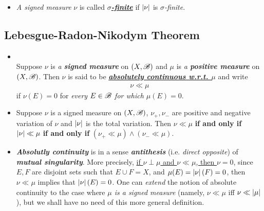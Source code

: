 \documentclass[11pt]{article}
\begin{document}
\begin{itemize}
\item \begin{definition} 
\emph{A signed measure} $\nu$ is called \underline{\emph{\textbf{$\sigma$-finite}}} if $\left\lvert \nu \right\rvert$ is \emph{$\sigma$-finite}.
\end{definition}
\end{itemize}

\subsection{Lebesgue-Radon-Nikodym Theorem}
\begin{itemize}
\item \begin{definition}\citep{folland2013real}\\
Suppose $\nu$ is \emph{a \textbf{signed measure}} on $(X,{\mathscr B})$ and $\mu$ is \emph{a \textbf{positive measure}} on $(X,{\mathscr B})$. Then $\nu$ is said to be \underline{\emph{\textbf{absolutely continuous w.r.t. $\mu$}}} and write
\begin{align*}
\nu \ll \mu 
\end{align*}
if $\nu(E)=0$ for \emph{every $E\in {\mathscr B}$ for which $\mu(E)=0$}. 
\end{definition}

\item
\begin{proposition}
Suppose $\nu$ is a signed measure on $(X,{\mathscr B})$,  $ \nu_{+}, \nu_{-}$ are positive and negative variation of $\nu$ and $\left\lvert \nu \right\rvert$ is the total variation. Then 
$\nu \ll \mu $ \textbf{if and only if} $\left\lvert \nu \right\rvert \ll \mu$ \textbf{if and only if} $(\nu_{+} \ll  \mu) \wedge (\nu_{-} \ll  \mu)$.
\end{proposition}

\item \begin{remark}
\emph{\textbf{Absolutly continuity}} is in a sense \emph{\textbf{antithesis}} (i.e. \emph{direct opposite}) of \emph{\textbf{mutual singularity}}. More precisely, 
\underline{if $\nu \perp \mu$ and $\nu \ll \mu$, then $\nu = 0$}, since $E, F$ are disjoint sets such that $E\cup F= X$, and $\mu(E)= \left\lvert \nu \right\rvert(F)= 0$, then $\nu \ll \mu$ implies that $\left\lvert \nu \right\rvert(E)= 0$. One can \emph{extend} the notion of absolute continuity to the case where \emph{$\mu$ is a signed measure} (namely, $\nu \ll \mu$ iff $\nu \ll \left\lvert \mu \right\rvert$), but we shall have no need of this more general definition.
 \end{remark}
 

\end{itemize}
\end{document}
